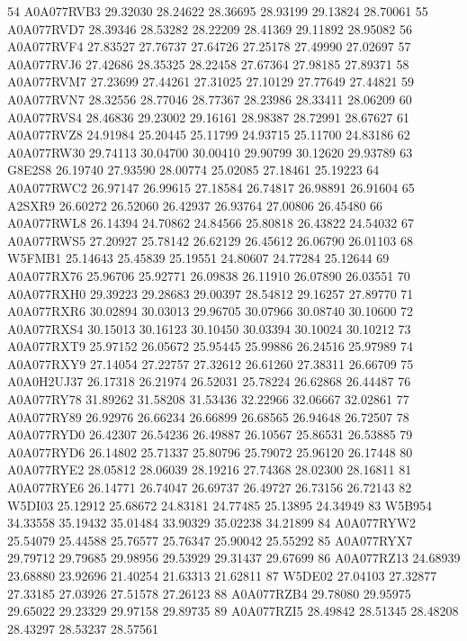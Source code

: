 \documentclass{beamer}
\begin{document}
\begin{frame}[fragile]
\begin{itemize}
\begin{Schunk}
\begin{Soutput}
54   A0A077RVB3 29.32030 28.24622 28.36695  28.93199  29.13824  28.70061
55   A0A077RVD7 28.39346 28.53282 28.22209  28.41369  29.11892  28.95082
56   A0A077RVF4 27.83527 27.76737 27.64726  27.25178  27.49990  27.02697
57   A0A077RVJ6 27.42686 28.35325 28.22458  27.67364  27.98185  27.89371
58   A0A077RVM7 27.23699 27.44261 27.31025  27.10129  27.77649  27.44821
59   A0A077RVN7 28.32556 28.77046 28.77367  28.23986  28.33411  28.06209
60   A0A077RVS4 28.46836 29.23002 29.16161  28.98387  28.72991  28.67627
61   A0A077RVZ8 24.91984 25.20445 25.11799  24.93715  25.11700  24.83186
62   A0A077RW30 29.74113 30.04700 30.00410  29.90799  30.12620  29.93789
63       G8E2S8 26.19740 27.93590 28.00774  25.02085  27.18461  25.19223
64   A0A077RWC2 26.97147 26.99615 27.18584  26.74817  26.98891  26.91604
65       A2SXR9 26.60272 26.52060 26.42937  26.93764  27.00806  26.45480
66   A0A077RWL8 26.14394 24.70862 24.84566  25.80818  26.43822  24.54032
67   A0A077RWS5 27.20927 25.78142 26.62129  26.45612  26.06790  26.01103
68       W5FMB1 25.14643 25.45839 25.19551  24.80607  24.77284  25.12644
69   A0A077RX76 25.96706 25.92771 26.09838  26.11910  26.07890  26.03551
70   A0A077RXH0 29.39223 29.28683 29.00397  28.54812  29.16257  27.89770
71   A0A077RXR6 30.02894 30.03013 29.96705  30.07966  30.08740  30.10600
72   A0A077RXS4 30.15013 30.16123 30.10450  30.03394  30.10024  30.10212
73   A0A077RXT9 25.97152 26.05672 25.95445  25.99886  26.24516  25.97989
74   A0A077RXY9 27.14054 27.22757 27.32612  26.61260  27.38311  26.66709
75   A0A0H2UJ37 26.17318 26.21974 26.52031  25.78224  26.62868  26.44487
76   A0A077RY78 31.89262 31.58208 31.53436  32.22966  32.06667  32.02861
77   A0A077RY89 26.92976 26.66234 26.66899  26.68565  26.94648  26.72507
78   A0A077RYD0 26.42307 26.54236 26.49887  26.10567  25.86531  26.53885
79   A0A077RYD6 26.14802 25.71337 25.80796  25.79072  25.96120  26.17448
80   A0A077RYE2 28.05812 28.06039 28.19216  27.74368  28.02300  28.16811
81   A0A077RYE6 26.14771 26.74047 26.69737  26.49727  26.73156  26.72143
82       W5DI03 25.12912 25.68672 24.83181  24.77485  25.13895  24.34949
83       W5B954 34.33558 35.19432 35.01484  33.90329  35.02238  34.21899
84   A0A077RYW2 25.54079 25.44588 25.76577  25.76347  25.90042  25.55292
85   A0A077RYX7 29.79712 29.79685 29.98956  29.53929  29.31437  29.67699
86   A0A077RZ13 24.68939 23.68880 23.92696  21.40254  21.63313  21.62811
87       W5DE02 27.04103 27.32877 27.33185  27.03926  27.51578  27.26123
88   A0A077RZB4 29.78080 29.95975 29.65022  29.23329  29.97158  29.89735
89   A0A077RZI5 28.49842 28.51345 28.48208  28.43297  28.53237  28.57561

\end{Soutput}
\end{Schunk}
\end{itemize}
\end{frame}
\end{document}
